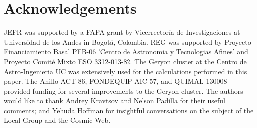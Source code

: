 \documentclass{emulateapj}
\begin{document}
\section*{Acknowledgements}
JEFR was supported by a FAPA grant by Vicerrector\'ia de
Investigaciones at Universidad de los Andes in Bogot\'a, Colombia.
REG was supported by Proyecto Financiamiento Basal PFB-06 'Centro de
Astronomia y Tecnologias Afines' and Proyecto Comit\'e Mixto ESO
3312-013-82. 
The Geryon cluster at the Centro de Astro-Ingenieria UC was
extensively used for the calculations performed in this paper. The
Anillo ACT-86, FONDEQUIP AIC-57, and QUIMAL 130008 provided funding
for several improvements to the Geryon cluster. 
The authors would like to thank Andrey Kravtsov and Nelson Padilla
for their useful comments; and Yehuda Hoffman for insightful
conversations on the subject of the Local Group and the Cosmic Web. 

 
\end{document}
